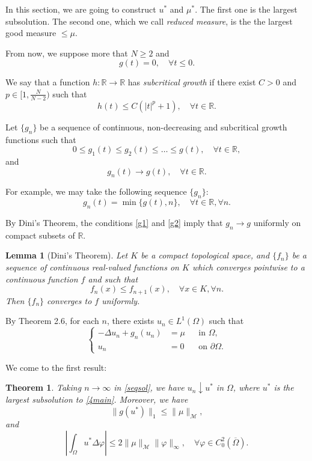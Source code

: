 \documentclass[a4paper, 11pt]{report}
\newtheorem{thm}{Theorem}[chapter]
\newtheorem{lmm}{Lemma}[chapter]
\theoremstyle{definition}\newtheorem*{rmk}{Remark}
\begin{document}
In this section, we are going to construct $u^*$ and $\mu ^*$. The first one is the largest subsolution. The second one, which we call \emph{reduced measure}, is the the largest good measure $\le \mu$.

From now, we suppose more that $N \ge 2$ and
\[
g(t) = 0,\quad \forall t \le 0.
\]

We say that a function $h:\mathbb{R} \to \mathbb{R}$ has \emph{subcritical growth} if there exist $C > 0$ and $p \in [1, \frac{N}{N-2})$ such that
\[
h(t) \le C(|t|^p + 1) ,\quad \forall t \in \mathbb{R}.
\]

Let $\{g_n\}$ be a sequence of continuous, non-decreasing and subcritical growth functions such that
\begin{equation}\label{g1}
0 \le g_{1}(t) \le g_{2}(t) \le \ldots \le g(t), \quad \forall t \in \mathbb{R},
\end{equation}
and
\begin{equation}\label{g2}
g_n(t) \to g(t) ,\quad \forall t \in \mathbb{R}.
\end{equation}

For example, we may take the following sequence $\{ g_n \}$:
\[
g_n(t) = \min \{g(t), n\},\quad \forall t \in \mathbb{R},\forall n.
\]

By Dini's Theorem, the conditions \eqref{g1} and \eqref{g2} imply that $g_n \to g$ uniformly on compact subsets of $\mathbb{R}$.

\begin{lmm}[Dini's Theorem]
Let $K$ be a compact topological space, and $\{f_n\}$ be a sequence of continuous real-valued functions on $K$ which converges pointwise to a continuous function $f$ and such that
\[
f_n(x) \le f_{n+1}(x), \quad \forall x\in K, \forall n.
\]
Then $\{f_n\}$ converges to $f$ uniformly.
\end{lmm}

By Theorem 2.6, for each $n$, there exists $u_n\in L^1(\Omega)$ such that
\begin{equation}\label{seqsol}
\left\{
\begin{aligned}
-\Delta u_n + g_n(u_n) & = \mu && \text{in } \Omega , \\
u_n & = 0 && \text{on } \partial \Omega.
\end{aligned}
\right.
\end{equation}

We come to the first result:

\begin{thm}\label{thm41}
Taking $n \to \infty$ in \eqref{seqsol}, we have $u_n \downarrow u^*$ in $\Omega$, where $u^*$ is the largest subsolution to \eqref{4main}. Moreover, we have
\begin{equation}\label{411}
\| g(u^*) \|_1 \le \| \mu \|_{\mathcal{M}},
\end{equation}
and
\begin{equation}\label{412}
\left| \int_{\Omega} u^* \Delta \varphi \right| \le 2 \|\mu\|_{\mathcal{M}}\|\varphi\|_{\infty},\quad \forall \varphi \in C^2_0(\overline{\Omega}).
\end{equation}
\end{thm}
\end{document}
